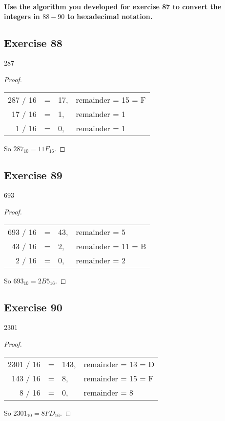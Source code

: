 \documentclass[14pt]{extarticle}
\newcommand{\cy}{\color{cyan}}
\begin{document}
{\bf\cy Use the algorithm you developed for exercise 87 to convert the integers in $88-90$ to hexadecimal notation.}

\subsection{Exercise 88}
287
\begin{proof}
    \begin{center}
        \begin{tabular}{rcll}
            287 / 16 & = & 17, & remainder = 15 = F \\
            17 / 16  & = & 1,  & remainder = 1      \\
            1 / 16   & = & 0,  & remainder = 1
        \end{tabular}
    \end{center}
    So $287_{10} = 11F_{16}$.
\end{proof}

\subsection{Exercise 89}
693
\begin{proof}
    \begin{center}
        \begin{tabular}{rcll}
            693 / 16 & = & 43, & remainder = 5      \\
            43 / 16  & = & 2,  & remainder = 11 = B \\
            2 / 16   & = & 0,  & remainder = 2
        \end{tabular}
    \end{center}
    So $693_{10} = 2B5_{16}$.
\end{proof}

\subsection{Exercise 90}
2301
\begin{proof}
    \begin{center}
        \begin{tabular}{rcll}
            2301 / 16 & = & 143, & remainder = 13 = D \\
            143 / 16  & = & 8,   & remainder = 15 = F \\
            8 / 16    & = & 0,   & remainder = 8
        \end{tabular}
    \end{center}
    So $2301_{10} = 8FD_{16}$.
\end{proof}
\end{document}
